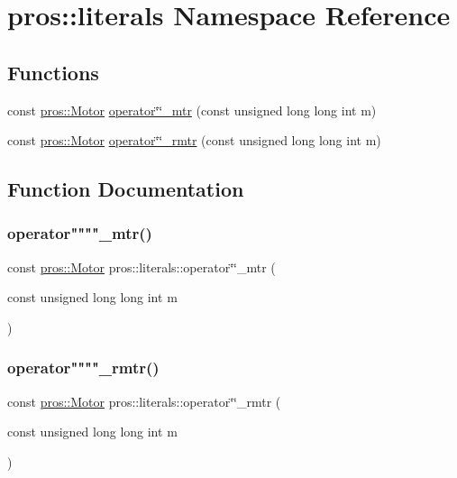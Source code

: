 \hypertarget{namespacepros_1_1literals}{}\section{pros\+::literals Namespace Reference}
\label{namespacepros_1_1literals}
\subsection*{Functions}
\begin{DoxyCompactItemize}
\item 
const \mbox{\hyperlink{classpros_1_1Motor}{pros\+::\+Motor}} \mbox{\hyperlink{namespacepros_1_1literals_af2d5211b971e03e0fa4e072cf8bf91a0}{operator\char`\"{}\char`\"{}\+\_\+mtr}} (const unsigned long long int m)
\item 
const \mbox{\hyperlink{classpros_1_1Motor}{pros\+::\+Motor}} \mbox{\hyperlink{namespacepros_1_1literals_ad6eb4fc1b6d77963aa9709725d368468}{operator\char`\"{}\char`\"{}\+\_\+rmtr}} (const unsigned long long int m)
\end{DoxyCompactItemize}


\subsection{Function Documentation}
\mbox{\label{namespacepros_1_1literals_af2d5211b971e03e0fa4e072cf8bf91a0}} 
\subsubsection{\texorpdfstring{operator""""\_mtr()}{operator""\_mtr()}}
{\footnotesize\ttfamily const \mbox{\hyperlink{classpros_1_1Motor}{pros\+::\+Motor}} pros\+::literals\+::operator\char`\"{}\char`\"{}\+\_\+mtr (\begin{DoxyParamCaption}\item[{const unsigned long long int}]{m }\end{DoxyParamCaption})}

\mbox{\label{namespacepros_1_1literals_ad6eb4fc1b6d77963aa9709725d368468}} 
\subsubsection{\texorpdfstring{operator""""\_rmtr()}{operator""\_rmtr()}}
{\footnotesize\ttfamily const \mbox{\hyperlink{classpros_1_1Motor}{pros\+::\+Motor}} pros\+::literals\+::operator\char`\"{}\char`\"{}\+\_\+rmtr (\begin{DoxyParamCaption}\item[{const unsigned long long int}]{m }\end{DoxyParamCaption})}

